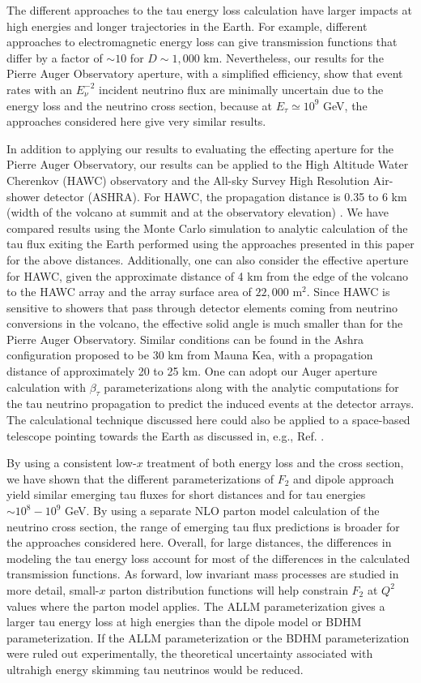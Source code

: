 \documentclass[aps,10pt,twocolumn,tightenlines]{revtex4-1}
\begin{document}
The different approaches to the tau energy loss calculation have larger impacts at high energies
and longer trajectories in the Earth.  For example, different approaches to electromagnetic energy loss can give  transmission 
functions that differ by a factor of $\sim 10$ for $D\sim 1,000$ km.  Nevertheless,
our results for the Pierre Auger Observatory aperture, with a simplified efficiency, show that event rates with an
$E_\nu^{-2}$ incident neutrino flux are minimally uncertain due to the energy loss and the neutrino cross section, because
at $E_\tau\simeq 10^9$ GeV, the approaches considered here give very similar results.

In addition to applying our results to evaluating the 
effecting aperture for the 
Pierre Auger Observatory, our results can be applied to 
 the High Altitude Water Cherenkov (HAWC) observatory and the 
All-sky Survey High Resolution Air-shower detector (ASHRA).  
For HAWC, the propagation distance is 0.35 to 6 km (width of the 
volcano at summit and at the observatory elevation) \cite{Vargas:2016hcp}.  
We have compared results using the Monte Carlo simulation to analytic 
calculation of the tau flux exiting the Earth performed using the approaches
presented in this paper for the above distances. 
Additionally, one can also consider the 
effective aperture for HAWC, given the 
approximate distance of 4 km from the edge of the volcano to 
the HAWC array and the array surface area of $22,000$ m$^2$. Since HAWC is sensitive to showers that pass through detector elements coming from neutrino conversions in 
the volcano, the effective solid angle is much smaller than for the Pierre Auger Observatory.  Similar 
conditions can be found in the Ashra configuration proposed to be 30 km from Mauna
Kea, with a propagation distance of approximately 20 to 25 km.  
One can adopt our Auger aperture calculation with $\beta_\tau$ 
parameterizations along with the analytic computations for the 
tau neutrino propagation to predict the induced events at the detector arrays.
The calculational technique discussed here could also be applied to a space-based telescope pointing towards the Earth as discussed in, e.g., Ref. \cite{Neronov:2016zou}.

By using a consistent low-$x$ treatment of both energy loss and the cross section, we have shown that the
different parameterizations of $F_2$ and dipole approach yield similar emerging tau fluxes for short distances and for
tau energies $\sim 10^8-10^9$ GeV. By using a separate
NLO parton model calculation of the neutrino cross section, the range of emerging tau flux predictions is broader for the 
approaches considered here. Overall, for large distances, the differences in modeling the tau energy loss account for most of the 
differences in the calculated transmission functions. As forward, low invariant mass processes are studied in more detail, small-$x$
parton distribution functions will help constrain $F_2$ at $Q^2$ values where the parton model applies. The ALLM
parameterization gives a larger tau energy loss at high energies than the dipole model or BDHM parameterization.
If the ALLM parameterization or the BDHM parameterization were ruled out experimentally, the theoretical uncertainty associated with ultrahigh
energy skimming tau neutrinos would be reduced. 
\end{document}
